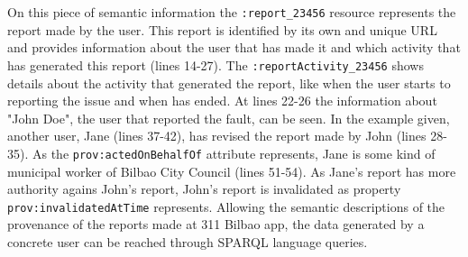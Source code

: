 On this piece of semantic information the \texttt{:report\_23456} resource represents the report made by the user. This report is identified by its own and unique URL and provides information about the user that has made it and which activity that has generated this report (lines 14-27). The \texttt{:reportActivity\_23456} shows details about the activity that generated the report, like when the user starts to reporting the issue and when has ended. At lines 22-26 the information about "John Doe", the user that reported the fault, can be seen. In the example given, another user, Jane (lines 37-42), has revised the report made by John (lines 28-35). As the \texttt{prov:actedOnBehalfOf} attribute represents, Jane is some kind of municipal worker of Bilbao City Council (lines 51-54). As Jane's report has more authority agains John's report, John's report is invalidated as property \texttt{prov:invalidatedAtTime} represents. Allowing the semantic descriptions of the provenance of the reports made at 311 Bilbao app, the data generated by a concrete user can be reached through SPARQL \cite{prudhommeaux_sparql_2008} language queries.
